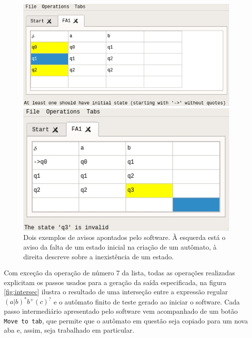 \documentclass{article}
\begin{document}
        \begin{figure}[!h]
            \centering
            \begin{minipage}[b]{.4\textwidth}
                \includegraphics[width=\textwidth]{print_warn1.jpg}
            \end{minipage}
            \begin{minipage}[b]{.4\textwidth}
                \includegraphics[width=\textwidth]{print_warn2.jpg}
            \end{minipage}
            \caption{Dois exemplos de avisos apontados pelo software. À
            esquerda está o aviso da falta de um estado inicial na criação de
            um autômato, à direita descreve sobre a inexistência de um estado.}
            \label{fig:2data}
        \end{figure}

        Com exceção da operação de número 7 da lista, todas as operações
        realizadas explicitam os passos usados para a geração da saída
        especificada, na figura \ref{fig:intersec} ilustra o resultado de uma
        interseção entre a expressão regular $(a|b)^{*}b^{+}(c)^{?}$ e o
        autômato finito de teste gerado ao iniciar o software. Cada passo
        intermediário apresentado pelo software vem acompanhado de um botão
        \texttt{Move to tab}, que permite que o autômato em questão seja
        copiado para um nova aba e, assim, seja trabalhado em particular.
\end{document}

